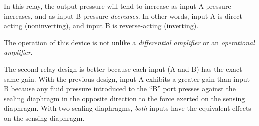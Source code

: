 





In this relay, the output pressure will tend to increase as input A pressure increases, and as input B pressure {\it decreases}.  In other words, input A is direct-acting (noninverting), and input B is reverse-acting (inverting).

\vskip 10pt

The operation of this device is not unlike a {\it differential amplifier} or an {\it operational amplifier}. 

\vskip 10pt

The second relay design is better because each input (A and B) has the exact same gain.  With the previous design, input A exhibits a greater gain than input B because any fluid pressure introduced to the ``B'' port presses against the sealing diaphragm in the opposite direction to the force exerted on the sensing diaphragm.  With two sealing diaphragms, {\it both} inputs have the equivalent effects on the sensing diaphragm.




